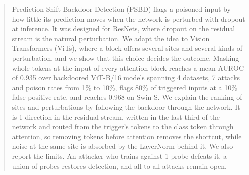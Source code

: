 \begin{abstract}
Prediction Shift Backdoor Detection (PSBD) flags a poisoned input by how little its prediction moves when the network is perturbed with dropout at inference. It was designed for ResNets, where dropout on the residual stream is the natural perturbation. We adapt the idea to Vision Transformers (ViTs), where a block offers several sites and several kinds of perturbation, and we show that this choice decides the outcome. Masking whole tokens at the input of every attention block reaches a mean AUROC of 0.935 over backdoored ViT-B/16 models spanning 4 datasets, 7 attacks and poison rates from 1\% to 10\%, flags 80\% of triggered inputs at a 10\% false-positive rate, and reaches 0.968 on Swin-S. We explain the ranking of sites and perturbations by following the backdoor through the network. It is 1 direction in the residual stream, written in the last third of the network and routed from the trigger's tokens to the class token through attention, so removing tokens before attention removes the shortcut, while noise at the same site is absorbed by the LayerNorm behind it. We also report the limits. An attacker who trains against 1 probe defeats it, a union of probes restores detection, and all-to-all attacks remain open.
\end{abstract}
